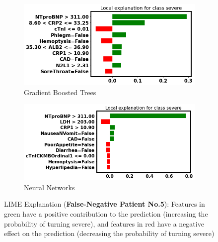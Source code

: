 \vfill

\clearpage

\null
\vfill

\begin{figure}[H] \ContinuedFloat
\begin{subfigure}[b]{\textwidth}
    \centering
    \includegraphics[width=\textwidth]{figures/chapter_interp/lime_xgbc_5.png}
    \caption{Gradient Boosted Trees}
    \label{fig:lime_xgbc_5}
\end{subfigure}
\hfill
\begin{subfigure}[b]{\textwidth}
    \centering
    \includegraphics[width=\textwidth]{figures/chapter_interp/lime_nn_5.png}
    \caption{Neural Networks}
    \label{fig:lime_nn_5}
\end{subfigure}
\caption{LIME Explanation (\textbf{False-Negative Patient No.5}): Features in green have a positive contribution to the prediction (increasing the probability of turning severe), and features in red have a negative effect on the prediction (decreasing the probability of turning severe)}
\label{fig:lime_5}
\end{figure}

\vfill

\clearpage


